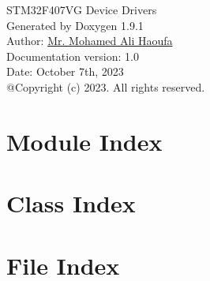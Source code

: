 \let\mypdfximage\pdfximage\def\pdfximage{\immediate\mypdfximage}\documentclass[twoside]{book}
\newcommand{\+}{\discretionary{\mbox{\scriptsize$\hookleftarrow$}}{}{}}
\newcommand{\clearemptydoublepage}{%
  \newpage{\pagestyle{empty}\cleardoublepage}%
}
\begin{document}
\raggedbottom

\hypersetup{pageanchor=false,
             bookmarksnumbered=true,
             pdfencoding=unicode
            }
\begin{titlepage}
\vspace*{7cm}
\begin{center}%
{\Large STM32\+F407\+VG Device Drivers }\\
\vspace*{1cm}
{\large Generated by Doxygen 1.9.1}\\
\vspace*{11cm}
{\large Author: \href{https://www.linkedin.com/in/mohamed-ali-haoufa/}{ Mr. Mohamed Ali Haoufa}}\\
\vspace*{0.3cm}
{\large Documentation version: 1.0}\\
\vspace*{0.3cm}
{\large Date: October 7th, 2023}\\
\vspace*{1cm}
{\large @Copyright (c) 2023. All rights reserved.}\\
\end{center}
\end{titlepage}
\clearemptydoublepage
{}
\tableofcontents
\clearemptydoublepage
{}
\hypersetup{pageanchor=true}

\chapter{Module Index}

\chapter{Class Index}

\chapter{File Index}

\end{document}
